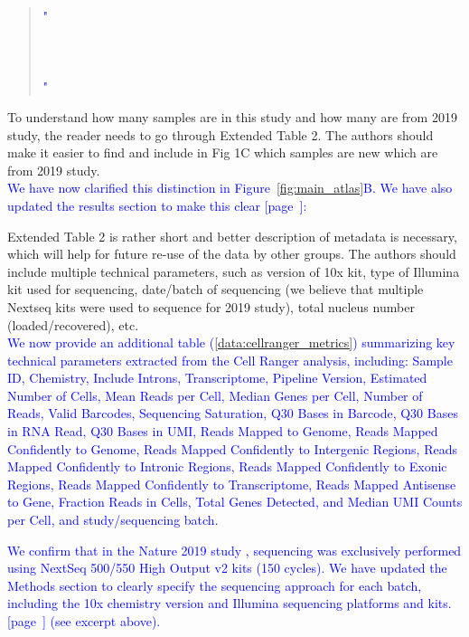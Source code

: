 \begin{quote}
	\textcolor{blue}{"\quoteJ\\ \\
	\quoteK\\ \\
	\quoteZ"}
\end{quote}

To understand how many samples are in this study and how many are from 2019 study, the reader needs to go through Extended Table 2. The authors should make it easier to find and include in Fig 1C which samples are new which are from 2019 study.\\
\textcolor{blue}{We have now clarified this distinction in Figure~\ref{fig:main_atlas}B. We have also updated the results section to make this clear [page~\pageref{quoteE-label}]:}

\begin{quote}
	\quoteE
\end{quote}

Extended Table 2 is rather short and better description of metadata is necessary, which will help for future re-use of the data by other groups. The authors should include multiple technical parameters, such as version of 10x kit, type of Illumina kit used for sequencing, date/batch of sequencing (we believe that multiple Nextseq kits were used to sequence for 2019 study), total nucleus number (loaded/recovered), etc.\\
\textcolor{blue}{We now provide an additional table (\ref{data:cellranger_metrics}) summarizing key technical parameters extracted from the Cell Ranger analysis, including: Sample ID, Chemistry, Include Introns, Transcriptome, Pipeline Version, Estimated Number of Cells, Mean Reads per Cell, Median Genes per Cell, Number of Reads, Valid Barcodes, Sequencing Saturation, Q30 Bases in Barcode, Q30 Bases in RNA Read, Q30 Bases in UMI, Reads Mapped to Genome, Reads Mapped Confidently to Genome, Reads Mapped Confidently to Intergenic Regions, Reads Mapped Confidently to Intronic Regions, Reads Mapped Confidently to Exonic Regions, Reads Mapped Confidently to Transcriptome, Reads Mapped Antisense to Gene, Fraction Reads in Cells, Total Genes Detected, and Median UMI Counts per Cell, and study/sequencing batch.}

\textcolor{blue}{We confirm that in the Nature 2019 study \cite{Mathys2019-wb}, sequencing was exclusively performed using NextSeq 500/550 High Output v2 kits (150 cycles). We have updated the Methods section to clearly specify the sequencing approach for each batch, including the 10x chemistry version and Illumina sequencing platforms and kits. [page~\pageref{quoteJ-label}] (see excerpt above).}\\

